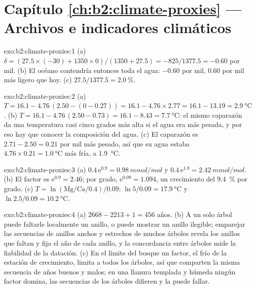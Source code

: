 \section*{Capítulo \ref{ch:b2:climate-proxies} --- Archivos e indicadores climáticos}

\begin{solution}{exo:b2:climate-proxies:1}
(a) $\delta = (27.5 \times (-30) + 1350 \times 0)/(1350 + 27.5) = -825/1377.5 = -0.60$ por mil.
(b) El océano contendría entonces toda el agua: $-0.60$ por mil, \num{0.60} por mil más ligero que
hoy. (c) $27.5/1377.5 = \qty{2.0}{\percent}$.
\end{solution}

\begin{solution}{exo:b2:climate-proxies:2}
(a) $T = 16.1 - 4.76\,(2.50 - (0 - 0.27)) = 16.1 - 4.76 \times 2.77 = 16.1 - 13.19 =
\qty{2.9}{\celsius}$. (b) $T = 16.1 - 4.76\,(2.50 - 0.73) = 16.1 - 8.43 = \qty{7.7}{\celsius}$: el
mismo caparazón da una temperatura casi cinco grados más alta si el agua era más pesada, y por eso
hay que conocer la composición del agua. (c) El caparazón es $2.71 - 2.50 = 0.21$ por mil más pesado,
así que su agua estaba $4.76 \times 0.21 = \qty{1.0}{\celsius}$ más fría, a \qty{1.9}{\celsius}.
\end{solution}

\begin{solution}{exo:b2:climate-proxies:3}
(a) $0.4\,\mathrm{e}^{0.9} = \qty{0.98}{mmol/mol}$ y $0.4\,\mathrm{e}^{1.8} =
\qty{2.42}{mmol/mol}$. (b) El factor es $\mathrm{e}^{0.9} = 2.46$; por grado, $\mathrm{e}^{0.09}
= 1.094$, un crecimiento del \qty{9.4}{\percent} por grado. (c) $T = \ln(\text{Mg/Ca}/0.4)/0.09$:
$\ln 5/0.09 = \qty{17.9}{\celsius}$ y $\ln 2.5/0.09 = \qty{10.2}{\celsius}$.
\end{solution}

\begin{solution}{exo:b2:climate-proxies:4}
(a) $2668 - 2213 + 1 = 456$ años. (b) A un solo árbol puede faltarle localmente un anillo, o puede mostrar un anillo
ilegible; emparejar las secuencias de anillos anchos y estrechos de muchos árboles revela los
anillos que faltan y fija el año de cada anillo, y la concordancia entre árboles mide la
fiabilidad de la datación. (c) En el límite del bosque un factor, el frío de la estación de crecimiento,
limita a todos los árboles, así que comparten la misma secuencia de años buenos y malos; en una llanura
templada y húmeda ningún factor domina, las secuencias de los árboles difieren y la  puede fallar.
\end{solution}

